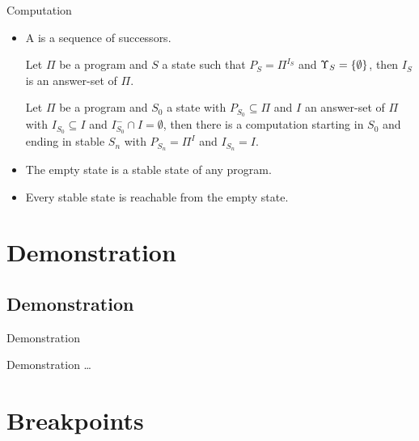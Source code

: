 \documentclass{beamer}
\begin{document}
\begin{frame}{Computation}

	\begin{itemize}
		\item A \emph{} is a sequence of successors.
		\pause
		\begin{theorem}[Soundness]
			Let $\Pi$ be a program and $S$ a state such that\newline
			$P_S = \Pi^{I_S}$ and $\Upsilon_S = \left\{{\emptyset}\right\}$, then
			$I_S$ is an answer-set of $\Pi$.
		\end{theorem}
		\pause
		\begin{theorem}[Completeness]
			Let $\Pi$ be a program and $S_0$ a state with $P_{S_0} \subseteq \Pi$ and\newline
			$I$ an answer-set of $\Pi$ with $I_{S_0} \subseteq I$ and $I^-_{S_0} \cap I = \emptyset$, then\newline
			there is a computation starting in $S_0$ and ending in stable $S_n$ with
			$P_{S_n} = \Pi^I$ and $I_{S_n} = I$.
		\end{theorem}
		\pause
		\item The empty state is a stable state of any program.
		\item Every stable state is reachable from the empty state.
	\end{itemize}

\end{frame}



\section{Demonstration}


\subsection{Demonstration}

\begin{frame}{Demonstration}

	\begin{center}
		Demonstration \ldots
	\end{center}

\end{frame}



\section{Breakpoints}
\end{document}
